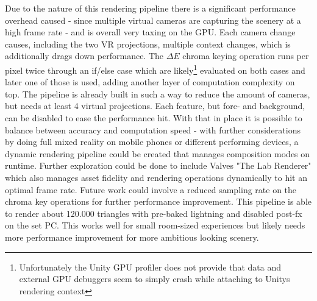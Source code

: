 Due to the nature of this rendering pipeline there is a significant performance 
overhead caused - since multiple virtual cameras are capturing the scenery at a 
high frame rate - and is overall very taxing on the GPU. Each camera change 
causes, including the two VR projections, multiple context changes, which is 
additionally drags down performance. The $\Delta E$ chroma keying operation 
runs per pixel twice through an if/else case which are 
likely\footnote{Unfortunately the Unity GPU profiler does not provide that 
data and external GPU debuggers seem to simply crash while attaching to Unitys 
rendering context} evaluated on both cases and later one of those is used, 
adding another layer of computation complexity on top. 
\newline
The pipeline is already built in such a way to reduce the amount of cameras, 
but needs at least 4 virtual projections. Each feature, but fore- and 
background, can be disabled to ease the performance hit. With that in place it 
is possible to balance between accuracy and computation speed - with further 
considerations by doing full mixed reality on mobile phones or different 
performing devices, a dynamic rendering pipeline could be created that manages 
composition modes on runtime. Further exploration could be done to include 
Valves "The Lab Renderer" which also manages asset fidelity and rendering 
operations dynamically to hit an optimal frame rate. Future work could involve 
a reduced sampling rate on the chroma key operations for further performance 
improvement.
\newline
This pipeline is able to render about 120.000 triangles with pre-baked 
lightning and disabled post-fx on the set PC. This works well for small 
room-sized experiences but likely needs more performance improvement for 
more ambitious looking scenery.